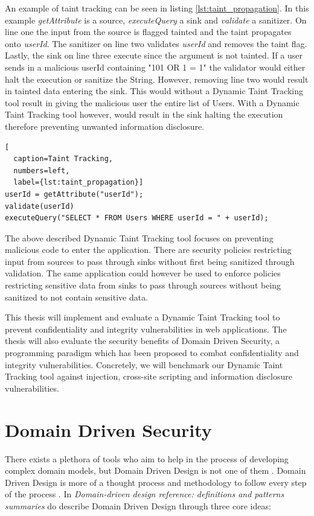 An example of taint tracking can be seen in listing \ref{lst:taint_propagation}. In this example \textit{getAttribute} is a source, \textit{executeQuery} a sink and \textit{validate} a sanitizer. On line one the input from the source is flagged tainted and the taint propagates onto \textit{userId}. The sanitizer on line two validates \textit{userId} and removes the taint flag. Lastly, the sink on line three execute since the argument is not tainted. If a user sends in a malicious userId containing "101 OR 1 = 1" the validator would either halt the execution or sanitize the String. However, removing line two would result in tainted data entering the sink. This would without a Dynamic Taint Tracking tool result in giving the malicious user the entire list of Users. With a Dynamic Taint Tracking tool however, would result in the sink halting the execution therefore preventing unwanted information disclosure.

\hfill
\begin{lstlisting}[
  caption=Taint Tracking,
  numbers=left,
  label={lst:taint_propagation}]
userId = getAttribute("userId");
validate(userId)
executeQuery("SELECT * FROM Users WHERE userId = " + userId);
\end{lstlisting}
\hfill

The above described Dynamic Taint Tracking tool focuses on preventing malicious code to enter the application. There are security policies restricting input from sources to pass through sinks without first being sanitized through validation. The same application could however be used to enforce policies restricting sensitive data from sinks to pass through sources without being sanitized to not contain sensitive data.

This thesis will implement and evaluate a Dynamic Taint Tracking tool to prevent confidentiality and integrity vulnerabilities in web applications. The thesis will also evaluate the security benefits of Domain Driven Security, a programming paradigm which has been proposed to combat confidentiality and integrity vulnerabilities. Concretely, we will benchmark our Dynamic Taint Tracking tool against injection, cross-site scripting and information disclosure vulnerabilities.


\section{Domain Driven Security}
\label{DomainDrivenSecurity}
There exists a plethora of tools who aim to help in the process of developing complex domain models, but Domain Driven Design is not one of them \parencite{Bankes, 10.1007/978-3-319-24309-2_33}. Domain Driven Design is more of a thought process and methodology to follow every step of the process \parencite{EvansEric2004Dd:t}. In \emph{Domain-driven design reference: definitions and patterns summaries} do \textcite{evans_2015} describe Domain Driven Design through three core ideas:

